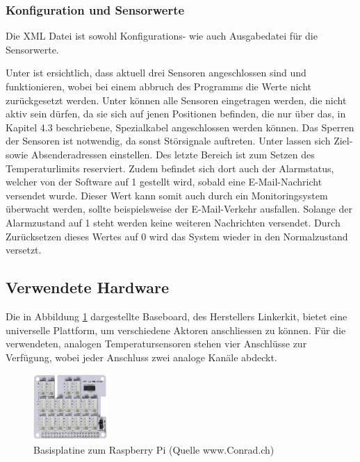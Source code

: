 \subsubsection{Konfiguration und Sensorwerte}
Die XML Datei  ist sowohl Konfigurations- wie auch Ausgabedatei für die Sensorwerte.



Unter  ist ersichtlich, dass aktuell drei Sensoren angeschlossen sind und funktionieren, wobei bei einem abbruch des Programms die Werte nicht zurückgesetzt werden. Unter  können alle Sensoren eingetragen werden, die nicht aktiv sein dürfen, da sie sich auf jenen Positionen befinden, die nur über das, in Kapitel 4.3 beschriebene, Spezialkabel angeschlossen werden können. Das Sperren der Sensoren ist notwendig, da sonst Störsignale auftreten. Unter  lassen sich Ziel- sowie Absenderadressen einstellen. Des letzte Bereich  ist zum Setzen des Temperaturlimits reserviert. Zudem befindet sich dort auch der Alarmstatus, welcher von der Software auf 1 gestellt wird, sobald eine E-Mail-Nachricht versendet wurde. Dieser Wert kann somit auch durch  ein Monitoringsystem überwacht werden, sollte beispielsweise der E-Mail-Verkehr ausfallen. Solange der Alarmzustand auf 1 steht werden keine weiteren Nachrichten versendet. Durch Zurücksetzen dieses Wertes auf 0 wird das System wieder in den Normalzustand versetzt. 

\subsection{Verwendete Hardware}

Die in Abbildung \ref{fig:plate} dargestellte Baseboard, des Herstellers Linkerkit, bietet eine universelle Plattform, um verschiedene Aktoren anschliessen zu können. Für die verwendeten, analogen Temperatursensoren stehen vier Anschlüsse zur Verfügung, wobei jeder Anschluss zwei analoge Kanäle abdeckt.

\begin{figure}[H]%
\centering
\includegraphics[width=0.25\textwidth]{Images/Basisplatine.jpg}
\caption{Basisplatine zum Raspberry Pi (Quelle www.Conrad.ch)}
\label{fig:plate}
\end{figure}

